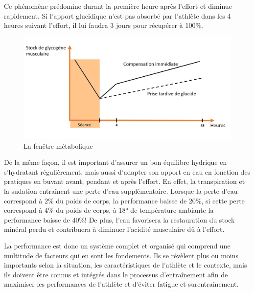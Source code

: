                     Ce phénomène prédomine durant la première heure après l’effort et diminue rapidement. Si l'apport glucidique n'est pas absorbé par l'athlète dans les 4 heures suivant l'effort, il lui faudra 3 jours pour récupérer à 100\%.
                    
                    \begin{figure}[H]
                        \centering \includegraphics[scale=1.2]{images/fenetre-metabolique.jpg}
                        \caption{\label{fig:fenetre_metaboliques}La fenêtre métabolique}
                    \end{figure}
                    
                    
                    De la même façon, il est important d’assurer un bon équilibre hydrique en s'hydratant régulièrement, mais aussi d'adapter son apport en eau en fonction des pratiques en buvant avant, pendant et après l’effort. En effet, la transpiration et la sudation entraînent une perte d'eau supplémentaire. Lorsque la perte d’eau correspond à 2\% du poids de corps, la performance baisse de 20\%, si cette perte correspond à 4\% du poids de corps, à 18° de température ambiante la performance baisse de 40\%!  De plus, l'eau favorisera la restauration du stock minéral perdu et contribuera à diminuer l’acidité musculaire dû à l'effort.
    
              \vspace{20pt} 
             

        La performance est donc un système complet et organisé qui comprend une multitude de facteurs qui en sont les fondements. Ils se révèlent plus ou moins importants selon la situation, les caractéristiques de l’athlète et le contexte, mais ils doivent être connus et intégrés dans le processus d’entraînement afin de maximiser les performances de l'athlète et d'éviter fatigue et surentraînement. 


    
    







